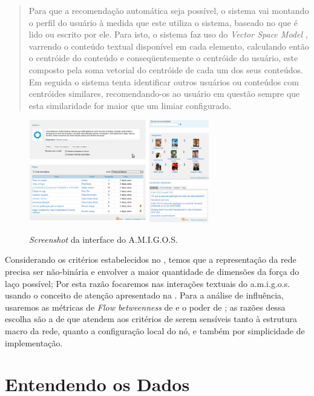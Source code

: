 \begin{quote}{\citep{RicardoAraujoCosta2008}}
\begin{description}
	Para que a recomendação automática seja possível, o sistema vai montando o
	perfil do usuário à medida que este utiliza o sistema, baseado no que é lido ou
	escrito por ele. Para isto, o sistema faz uso do \emph{Vector Space Model}
	\citep{Barros2002}, varrendo o conteúdo textual disponível em cada elemento,
	calculando então o centróide do conteúdo e conseqüentemente o centróide do
	usuário, este composto pela soma vetorial do centróide de cada um dos seus
	conteúdos. Em seguida o sistema tenta identificar outros usuários ou conteúdos
	com centróides similares, recomendando-os ao usuário em questão sempre que
	esta similaridade for maior que um limiar configurado.
	\end{description}
\end{quote}

\begin{figure}[h!]
  \caption{\emph{Screenshot} da interface do A.M.I.G.O.S.}
  \centering
    \includegraphics[width=0.7\textwidth]{imgs/screenshot-amigos.png}
    \label{ap:fig:screenshot}
\end{figure}

Considerando os critérios estabelecidos no , temos que a
representação da rede precisa ser não-binária e envolver a maior quantidade de
dimensões da força do laço possível; Por esta razão focaremos nas interações
textuais do a.m.i.g.o.s. usando o conceito de atenção apresentado na
. Para a análise de influência, usaremos as métricas
de \emph{Flow betweenness} de \citeauthor{Freeman1991} e o poder de
\citeauthor{Bonacich1987}; as razões dessa escolha são a de que atendem aos
critérios de serem sensíveis tanto à estrutura macro da rede, quanto a
configuração local do nó, e também por simplicidade de implementação.

\section{Entendendo os Dados}
\label{ap:sec:dados}

